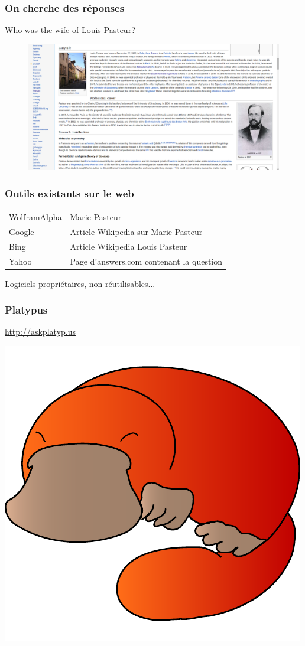 \begin{frame}
    \frametitle{On cherche des réponses}
    \alert{Who was the wife of Louis Pasteur?}
    \begin{figure}
        \includegraphics[width=\textwidth]{pasteurWiki.png}
    \end{figure}
\end{frame}

\begin{frame}
    \frametitle{Outils existants sur le web}
    \begin{tabular}{ll}
        WolframAlpha & Marie Pasteur\\
        Google & Article Wikipedia sur Marie Pasteur\\
        Bing & Article Wikipedia Louis Pasteur\\
        Yahoo & Page d'answers.com contenant la question
    \end{tabular}
\medbreak
\alert{Logiciels propriétaires, non réutilisables...}
\end{frame}

\begin{frame}
    \frametitle{Platypus}
    \begin{center}
        \alert{\url{http://askplatyp.us}}
        
        \bigskip
        
        \includegraphics[width=0.6\linewidth]{figures/platypus.pdf}
    \end{center}
\end{frame}

